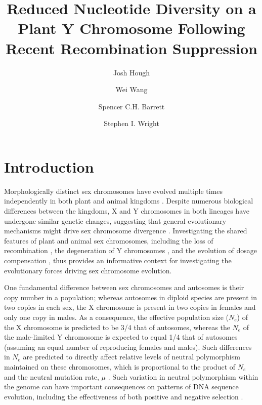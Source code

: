 \documentclass[9pt,twocolumn,twoside]{gsajnl}
\title{Reduced Nucleotide Diversity on a Plant Y Chromosome Following Recent Recombination Suppression}
\author[$\ast$,$\dagger$,1]{Josh Hough}
\author[$\dagger$]{Wei Wang}
\author[$\dagger$]{Spencer C.H. Barrett}
\author[$\dagger$]{Stephen I. Wright}
\affil[$\ast$]{Department of Plant Sciences, University of California, Davis}
\affil[$\dagger$]{Department of Ecology and Evolutionary Biology, University of Toronto}
\begin{document}
\maketitle
\thispagestyle{firststyle}
\marginmark
\firstpagefootnote
{}
\vspace{-11pt}

\section*{Introduction}

\lettrine[lines=2]{\color{color2}M}{}orphologically distinct sex chromosomes have evolved multiple times independently in both plant and animal kingdoms \citep{westergaard1958,ohno1967,bull1983,charlesworth1991}. Despite numerous biological differences between the kingdoms, X and Y chromosomes in both lineages have undergone similar genetic changes, suggesting that general evolutionary mechanisms might drive sex chromosome divergence \citep{charlesworth1978,charlesworth1996CB,charlesworth2000degeneration}. Investigating the shared features of plant and animal sex chromosomes, including the loss of recombination \citep{bergero2009}, the degeneration of Y chromosomes \citep{hough2014,bergero2015}, and the evolution of dosage compensation \citep{muyle2012,papadopulos2015}, thus provides an informative context for investigating the evolutionary forces driving sex chromosome evolution.

One fundamental difference between sex chromosomes and autosomes is their copy number in a population; whereas autosomes in diploid species are present in two copies in each sex, the X chromosome is present in two copies in females and only one copy in males. As a consequence, the effective population size ($N_{e}$) of the X chromosome is predicted to be 3/4 that of autosomes, whereas the $N_{e}$ of the male-limited Y chromosome is expected to equal 1/4 that of autosomes (assuming an equal number of reproducing females and males). Such differences in $N_{e}$ are predicted to directly affect relative levels of neutral polymorphism maintained on these chromosomes, which is proportional to the product of $N_{e}$ and the neutral mutation rate, $\mu$ \citep{Kimura1984}. Such variation in neutral polymorphism within the genome can have important consequences on patterns of DNA sequence evolution, including the effectiveness of both positive and negative selection \citep{charlesworth1987}.
\end{document}
